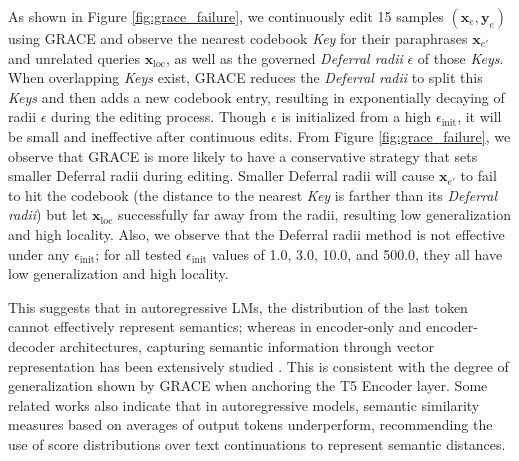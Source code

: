 As shown in Figure \ref{fig:grace_failure}, we continuously edit 15 samples $(\mathbf{x}_e, \mathbf{y}_e)$ using GRACE and observe the nearest codebook \textit{Key} for their paraphrases $\mathbf{x}_{e'}$ and unrelated queries $\mathbf{x}_{\text{loc}}$, as well as the governed \textit{Deferral radii} $\epsilon$ of those \textit{Keys}.
When overlapping \textit{Keys} exist, GRACE reduces the \textit{Deferral radii} to split this \textit{Keys} and then adds a new codebook entry, resulting in exponentially decaying of radii $\epsilon$ during the editing process. Though $\epsilon$ is initialized from a high $\epsilon_{\text{init}}$, it will be small and ineffective after continuous edits. 
From Figure \ref{fig:grace_failure}, we observe that GRACE is more likely to have a conservative strategy that sets smaller Deferral radii during editing. Smaller Deferral radii will cause $\mathbf{x}_{e'}$ to fail to hit the codebook (the distance to the nearest \textit{Key} is farther than its \textit{Deferral radii}) but let $\mathbf{x}_{\text{loc}}$ successfully far away from the radii, resulting low generalization and high locality. Also, we observe that the Deferral radii method is not effective under any $\epsilon_{\text{init}}$; for all tested $\epsilon_{\text{init}}$ values of 1.0, 3.0, 10.0, and 500.0, they all have low generalization and high locality. 

This suggests that in autoregressive LMs, the distribution of the last token cannot effectively represent semantics; whereas in encoder-only and encoder-decoder architectures, capturing semantic information through vector representation has been extensively studied \cite{bert, sentencebert, simcse}. This is consistent with the degree of generalization shown by GRACE when anchoring the T5 \cite{T5} Encoder layer. 
Some related works \cite{meaning_trajectory} also indicate that in autoregressive models, semantic similarity measures based on averages of output tokens underperform, recommending the use of score distributions over text continuations to represent semantic distances.

